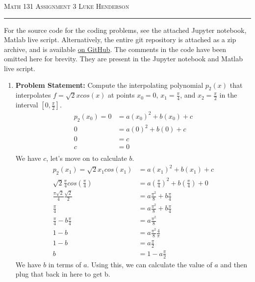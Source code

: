 \documentclass[12pt]{amsart}
\begin{document}
{\scshape Math 131} \hfill {\scshape \large Assignment 3} \hfill {\scshape Luke Henderson}
\smallskip
\hrule
\bigskip

For the source code for the coding problems, see the attached Jupyter notebook, Matlab live script. Alternatively, the entire git repository  is attached as a zip archive, and is available \href{https://github.com/blackHat-Magic/math-131-HW3}{on GitHub}. The comments in the code have been omitted here for brevity. They are present in the Jupyter notebook and Matlab live script.

\begin{enumerate}
    \item \textbf{Problem Statement:} Compute the interpolating polynomial $p_2(x)$ that interpolates $f = \sqrt{2}xcos(x)$ at points $x_0 = 0$, $x_1 = \frac{\pi}{4}$, and $x_2 = \frac{\pi}{2}$ in the interval $[0, \frac{\pi}{2}]$.
    \begin{align*}
        p_2(x_0) = 0 & = a(x_0)^2 + b(x_0) + c \\
        0 & = a(0)^2 + b(0) + c \\
        0 & = c \\
        c & = 0 \\
    \end{align*}
    We have $c$, let's move on to calculate $b$.
    \begin{align*}
        p_2(x_1) = \sqrt{2}x_1cos(x_1) & = a(x_1)^2 + b(x_1) + c \\
        \sqrt{2}\frac{\pi}{4}cos\left(\frac{\pi}{4}\right) & = a\left(\frac{\pi}{4}\right)^2 + b\left(\frac{\pi}{4}\right) + 0 \\
        \frac{\pi\sqrt{2}}{4}\frac{\sqrt{2}}{2} & = a\frac{\pi^2}{8} + b\frac{\pi}{4} \\
        \frac{\pi}{4} & = a\frac{\pi^2}{8} + b\frac{\pi}{4} \\
        \frac{\pi}{4} - b\frac{\pi}{4} & = a\frac{\pi^2}{8} \\
        1 - b & = a\frac{\pi^2}{8}\frac{4}{\pi} \\
        1 - b & = a\frac{\pi}{2} \\
        b & = 1 - a\frac{\pi}{2}
    \end{align*}
    We have $b$ in terms of $a$. Using this, we can calculate the value of $a$ and then plug that back in here to get b.
\end{enumerate}
\end{document}

